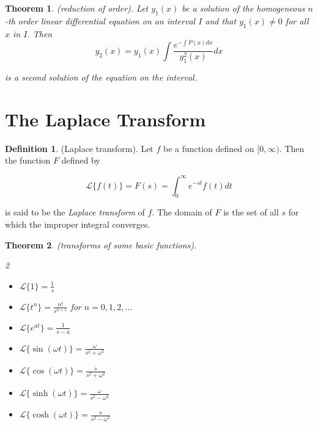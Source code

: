 \documentclass{article}
\theoremstyle{plain}
\newtheorem{thm}{Theorem}[section]
\theoremstyle{definition}
\newtheorem{defn}{Definition}[section]
\theoremstyle{remark}
\begin{document}
\begin{thm} (reduction of order).
    Let \(y_1(x)\) be a solution of the homogeneous \(n\)-th order linear differential equation on an interval \(I\) and that \(y_1(x) \neq 0\) for all \(x\) in \(I\). Then
    \begin{equation}
        y_2(x) = y_1(x) \int \frac{e^{-\int P(x)dx}}{y_1^2(x)}dx
    \end{equation}

    \noindent is a second solution of the equation on the interval.
\end{thm} 

\section{The Laplace Transform}

\begin{defn} (Laplace transform). 
    Let \(f\) be a function defined on \([0,\infty)\). Then the function \(F\) defined by

    \begin{equation}
        \mathcal{L} \{f(t)\} = F(s) = \int_0^\infty e^{-st} f(t) dt
    \end{equation}

    \noindent is said to be the \emph{Laplace transform} of \(f\). The domain of \(F\) is the set of all \(s\) for which the improper integral converges.

\end{defn}

\begin{thm} (transforms of some basic functions).
    \begin{multicols}{2}
    \begin{itemize}
        \item [(a)] \(\displaystyle\mathcal{L} \{1\} = \frac{1}{s}\)
        \item [(b)] \(\displaystyle\mathcal{L} \{t^n\} = \frac{n!}{s^{n+1}}\) for \(n = 0, 1, 2, \ldots\)
        \item [(c)] \(\displaystyle\mathcal{L} \{e^{at}\} = \frac{1}{s-a}\)
        \item [(d)] \(\displaystyle\mathcal{L} \{\sin(\omega t)\} = \frac{\omega}{s^2 + \omega^2}\)
        \item [(e)] \(\displaystyle\mathcal{L} \{\cos(\omega t)\} = \frac{s}{s^2 + \omega^2}\)
        \item [(f)] \(\displaystyle\mathcal{L} \{\sinh(\omega t)\} = \frac{\omega}{s^2 - \omega^2}\)
        \item [(g)] \(\displaystyle\mathcal{L} \{\cosh(\omega t)\} = \frac{s}{s^2 - \omega^2}\)
    \end{itemize}
    \end{multicols}    
\end{thm}
\end{document}

